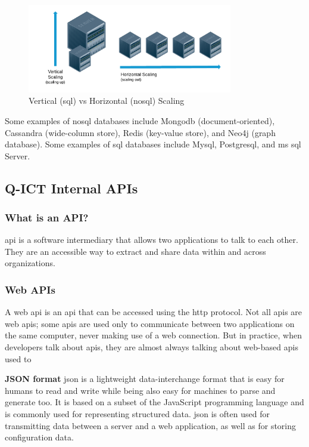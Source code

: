 \begin{figure}[htbp]
      \centering
      \includegraphics[width=0.8\textwidth]{Figures/nosql-scalling.png}
      \caption{Vertical (\acrshort{sql}) \acrshort{vs} Horizontal (\acrshort{nosql}) Scaling}
      \label{fig:graphqlvsrestarchitecture}
\end{figure}

\begin{multicols}{2}
      Some examples of \acrshort{nosql} databases include Mongo\acrshort{db} (document-oriented), Cassandra (wide-column store), Redis
      (key-value store), and Neo4j (graph database). Some examples of \acrshort{sql} databases include My\acrshort{sql},
      Postgres\acrshort{ql}, and \acrshort{ms} \acrshort{sql} Server.
      \subsection{Q-ICT Internal APIs}
      \subsubsection{What is an API?}
      \acrshort{api} is a software intermediary that allows two applications to talk to each other. They are an
      accessible way to extract and share data within and across organizations.
      \subsubsection{Web APIs}
      A web \acrshort{api} is an \acrshort{api} that can be accessed using the \acrshort{http} protocol. Not all
      \acrshort{api}s are web \acrshort{api}s; some \acrshort{api}s are used only to communicate between two
      applications on the same computer, never making use of a web connection. But in practice, when developers talk
      about \acrshort{api}s, they are almost always talking about web-based \acrshort{api}s used to

      \textbf{JSON format}
      \acrshort{json} is a lightweight data-interchange format that is easy for humans to read and write while being
      also easy for machines to parse and generate too. It is based on a subset of the JavaScript programming language
      and is commonly used for representing structured data. \acrshort{json} is often used for transmitting data between
      a server and a web application, as well as for storing configuration data.


\end{multicols}
